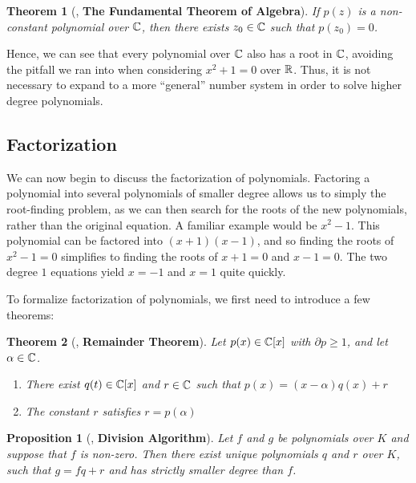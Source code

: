 \documentclass[11pt, a4paper, oneside]{article}
\theoremstyle{plain}
\newtheorem*{thm*}{Theorem}
\theoremstyle{plain}
\newtheorem*{prop*}{Proposition}
\theoremstyle{plain}
\theoremstyle{plain}
\theoremstyle{definition}
\theoremstyle{example}
\begin{document}
\begin{thm*}[{\cite[Thm.\ 2.4]{stewart}}, \textbf{The Fundamental Theorem of Algebra}] 
If $p(z)$ is a non-constant polynomial over $\mathbb{C}$, then there exists $z_0 \in \mathbb{C}$ such that $p(z_0) = 0$.
\end{thm*}

Hence, we can see that every polynomial over $\mathbb{C}$ also has a root in $\mathbb{C}$, avoiding the pitfall we ran into when considering $x^2 + 1 = 0$ over $\mathbb{R}$. Thus, it is not necessary to expand to a more ``general'' number system in order to solve higher degree polynomials.

\subsection{Factorization}

We can now begin to discuss the factorization of polynomials. Factoring a polynomial into several polynomials of smaller degree allows us to simply the root-finding problem, as we can then search for the roots of the new polynomials, rather than the original equation. A familiar example would be $x^2 - 1$. This polynomial can be factored into $(x+1)(x-1)$, and so finding the roots of $x^2 - 1 = 0$ simplifies to finding the roots of $x+1 = 0$ and $x - 1 = 0$. The two degree $1$ equations yield $x = -1$ and $x = 1$ quite quickly.

\par
To formalize factorization of polynomials, we first need to introduce a few theorems:

\begin{thm*}[{\cite[Thm.\ 2.5]{stewart}}, \textbf{Remainder Theorem}] 
Let $p(x) \in \mathbb{C}[x]$ with $\partial p \geq 1$, and let $\alpha \in \mathbb{C}$.
\begin{enumerate}
\item There exist $q(t) \in \mathbb{C}[x]$ and $r \in \mathbb{C}$ such that $p(x) = (x - \alpha)q(x) + r$
\item The constant $r$ satisfies $r = p(\alpha)$
\end{enumerate}
\end{thm*}

\begin{prop*}[{\cite[Prop.\ 3.1]{stewart}}, \textbf{Division Algorithm}] 
Let $f$ and $g$ be polynomials over $K$ and suppose that $f$ is non-zero. Then there exist unique polynomials $q$ and $r$ over $K$, such that $g = fq + r$ and has strictly smaller degree than $f$.
\end{prop*}
\end{document}
